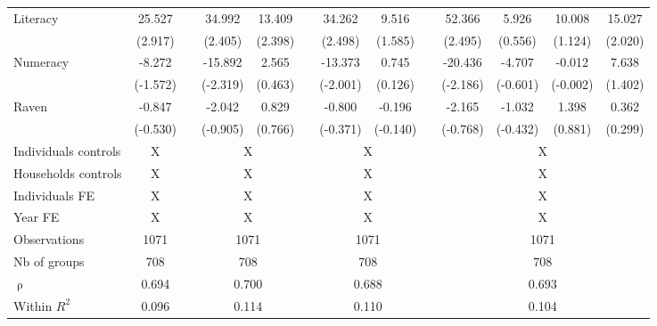 \begin{table}[htbp]
{\begin{tabular}{lcccccccccccc}
    Literacy & \cellcolor[rgb]{ 1,  1,  0}25.527 &       & \cellcolor[rgb]{ 1,  1,  0}34.992 & \cellcolor[rgb]{ 1,  1,  0}13.409 &       & \cellcolor[rgb]{ 1,  1,  0}34.262 & 9.516 &       & \cellcolor[rgb]{ 1,  1,  0}52.366 & 5.926 & 10.008 & \cellcolor[rgb]{ 1,  1,  0}15.027 \\
          & (2.917) &       & (2.405) & (2.398) &       & (2.498) & (1.585) &       & (2.495) & (0.556) & (1.124) & (2.020) \\
    Numeracy & -8.272 &       & \cellcolor[rgb]{ 1,  1,  0}-15.892 & 2.565 &       & -13.373 & 0.745 &       & \cellcolor[rgb]{ 1,  1,  0}-20.436 & -4.707 & -0.012 & 7.638 \\
          & (-1.572) &       & (-2.319) & (0.463) &       & (-2.001) & (0.126) &       & (-2.186) & (-0.601) & (-0.002) & (1.402) \\
    Raven & -0.847 &       & -2.042 & 0.829 &       & -0.800 & -0.196 &       & -2.165 & -1.032 & 1.398 & 0.362 \\
          & (-0.530) &       & (-0.905) & (0.766) &       & (-0.371) & (-0.140) &       & (-0.768) & (-0.432) & (0.881) & (0.299) \\
\cmidrule{1-2}\cmidrule{4-5}\cmidrule{7-8}\cmidrule{10-13}    Individuals controls & X     &       & \multicolumn{2}{c}{X} &       & \multicolumn{2}{c}{X} &       & \multicolumn{4}{c}{X} \\
    Households controls & X     &       & \multicolumn{2}{c}{X} &       & \multicolumn{2}{c}{X} &       & \multicolumn{4}{c}{X} \\
    Individuals FE & X     &       & \multicolumn{2}{c}{X} &       & \multicolumn{2}{c}{X} &       & \multicolumn{4}{c}{X} \\
    Year FE & X     &       & \multicolumn{2}{c}{X} &       & \multicolumn{2}{c}{X} &       & \multicolumn{4}{c}{X} \\
    \midrule
    Observations & 1071  &       & \multicolumn{2}{c}{1071} &       & \multicolumn{2}{c}{1071} &       & \multicolumn{4}{c}{1071} \\
    Nb of groups & 708   &       & \multicolumn{2}{c}{708} &       & \multicolumn{2}{c}{708} &       & \multicolumn{4}{c}{708} \\
    $\uprho$ & 0.694 &       & \multicolumn{2}{c}{0.700} &       & \multicolumn{2}{c}{0.688} &       & \multicolumn{4}{c}{0.693} \\
    Within $R^2$ & 0.096 &       & \multicolumn{2}{c}{0.114} &       & \multicolumn{2}{c}{0.110} &       & \multicolumn{4}{c}{0.104} \\

\end{tabular}}
\end{table}
